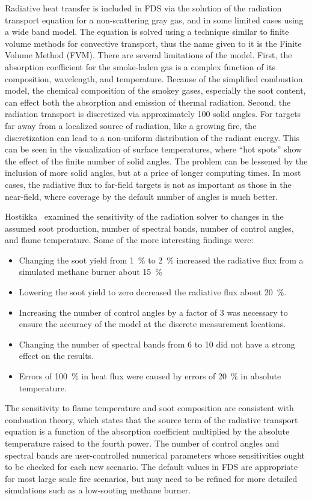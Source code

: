\documentclass[11pt]{book}
\begin{document}
Radiative heat  transfer is  included in FDS  via the solution  of the radiation  transport equation for  a non-scattering  gray gas,  and in some
limited  cases using  a wide band  model. The equation  is solved using  a technique  similar to  finite volume  methods  for convective transport,
thus the  name given  to it  is the  Finite  Volume Method (FVM).  There  are  several  limitations  of  the  model.  First,  the absorption
coefficient  for the smoke-laden gas is  a complex function of  its  composition, wavelength, and temperature.  Because  of  the  simplified combustion  model,
the  chemical  composition of  the  smokey  gases, especially  the  soot content,  can  effect  both  the absorption  and emission  of thermal
radiation.  Second, the  radiation transport  is discretized via  approximately 100 solid angles. For  targets far away from  a  localized source  of
radiation,  like  a growing  fire,  the discretization can  lead to a non-uniform distribution  of the radiant energy. This can be seen in the
visualization of surface temperatures, where  ``hot spots'' show  the effect  of the  finite number  of solid angles. The  problem can  be lessened
by  the inclusion of  more solid angles, but at  a price of longer computing times.  In most cases, the radiative flux  to far-field targets is  not
as important  as those in the near-field, where coverage by the default number of angles is much better.

Hostikka~\cite{Hostikka:2008} examined the sensitivity of the radiation solver to changes in  the assumed soot production, number  of spectral bands, number
of control  angles, and  flame temperature.  Some of  the more interesting findings were:
\begin{itemize}
\item  Changing  the  soot  yield  from 1~\%  to  2~\%  increased  the radiative flux from a simulated methane burner about 15~\%
\item Lowering  the soot  yield to zero  decreased the  radiative flux about 20~\%.
\item Increasing  the number of  control angles by  a factor of  3 was necessary  to  ensure  the  accuracy  of the  model  at  the  discrete measurement locations.
\item Changing the number of spectral  bands from 6 to 10 did not have a strong effect on the results.
\item Errors of 100~\% in heat  flux were caused by errors of 20~\% in absolute temperature.
\end{itemize}
The  sensitivity  to  flame   temperature  and  soot  composition  are consistent with  combustion theory, which states that  the source term of the
radiative transport equation  is a function of  the absorption coefficient  multiplied  by the  absolute  temperature  raised to  the fourth  power.
The  number of  control angles  and spectral  bands are user-controlled numerical  parameters whose sensitivities  ought to be checked  for  each
new  scenario.  The  default  values  in  FDS  are appropriate for  most large scale fire  scenarios, but may  need to be refined for  more detailed
simulations  such as a  low-sooting methane burner.
\end{document}
